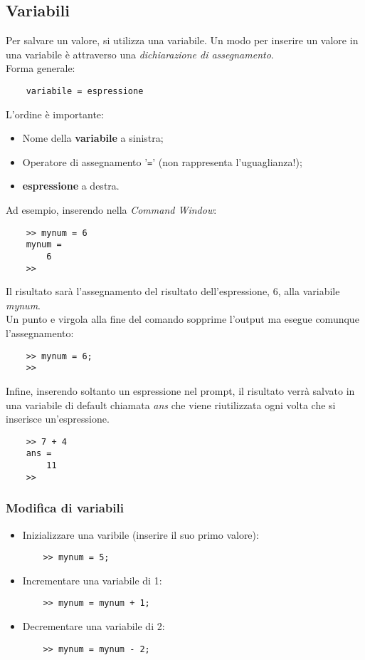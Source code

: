 \documentclass[a4paper, 10pt]{article}
\begin{document}
	\subsection{Variabili}
	Per salvare un valore, si utilizza una variabile. Un modo per inserire un valore in una variabile è attraverso una \textit{dichiarazione di assegnamento}. \\
	Forma generale:
	\begin{lstlisting}
	variabile = espressione
	\end{lstlisting}
L'ordine è importante:
\begin{itemize}
\item Nome della \textbf{variabile} a sinistra;
\item Operatore di assegnamento '\lstinline|=|' (non rappresenta l'uguaglianza!);
\item \textbf{espressione} a destra.
\end{itemize}
Ad esempio, inserendo nella \textit{Command Window}:
	\begin{lstlisting}
	>> mynum = 6
	mynum =
		6
	>>
	\end{lstlisting}
Il risultato sarà l'assegnamento del risultato dell'espressione, 6, alla variabile \textit{mynum}. \\
Un punto e virgola alla fine del comando sopprime l'output ma esegue comunque l'assegnamento:
	\begin{lstlisting}
	>> mynum = 6;
	>>
	\end{lstlisting}
Infine, inserendo soltanto un espressione nel prompt, il risultato verrà salvato in una variabile di default chiamata \textit{ans} che viene riutilizzata ogni volta che si inserisce un'espressione.
	\begin{lstlisting}
	>> 7 + 4
	ans =
		11
	>>
	\end{lstlisting}
	
	\subsubsection{Modifica di variabili}
	\begin{itemize}
	\item Inizializzare una varibile (inserire il suo primo valore):
	\begin{lstlisting}
	>> mynum = 5;
	\end{lstlisting}
	\item Incrementare una variabile di 1:
	\begin{lstlisting}
	>> mynum = mynum + 1;
	\end{lstlisting}
	\item Decrementare una variabile di 2:
	\begin{lstlisting}
	>> mynum = mynum - 2;
	\end{lstlisting}
	\end{itemize}
	
\end{document}
